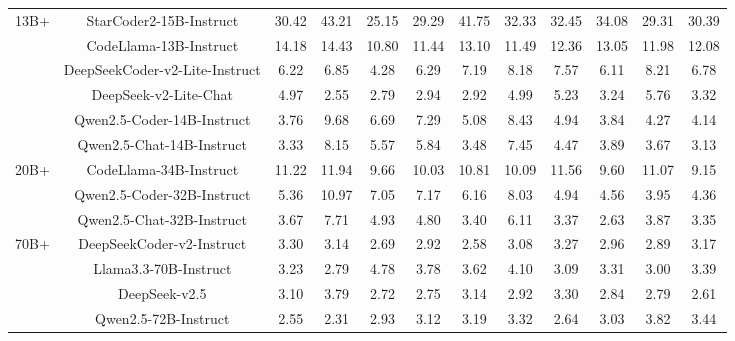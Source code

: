 \documentclass[11pt, a4paper, logo, copyright, nonumbering, amsart]{map}
\begin{document}
\begin{CJK*}{UTF8}{gbsn}
\begin{table*}[h!]
\begin{adjustbox}{width=\textwidth}
\begin{tabular}{c|c|cccccccccc}
    \midrule
    \multirow{6}{*}{13B+} 
    & StarCoder2-15B-Instruct & 30.42 & 43.21 & 25.15 & 29.29 & 41.75 & 32.33 & 32.45 & 34.08 & 29.31 & 30.39 \\
    & CodeLlama-13B-Instruct & 14.18 & 14.43 & 10.80 & 11.44 & 13.10 & 11.49 & 12.36 & 13.05 & 11.98 & 12.08 \\
    & DeepSeekCoder-v2-Lite-Instruct & 6.22 & 6.85 & 4.28 & 6.29 & 7.19 & 8.18 & 7.57 & 6.11 & 8.21 & 6.78 \\
    & DeepSeek-v2-Lite-Chat & 4.97 & 2.55 & 2.79 & 2.94 & 2.92 & 4.99 & 5.23 & 3.24 & 5.76 & 3.32 \\
    & Qwen2.5-Coder-14B-Instruct & 3.76 & 9.68 & 6.69 & 7.29 & 5.08 & 8.43 & 4.94 & 3.84 & 4.27 & 4.14 \\
    & Qwen2.5-Chat-14B-Instruct & 3.33 & 8.15 & 5.57 & 5.84 & 3.48 & 7.45 & 4.47 & 3.89 & 3.67 & 3.13 \\
    
    \midrule
    \multirow{3}{*}{20B+} 
    & CodeLlama-34B-Instruct & 11.22 & 11.94 & 9.66 & 10.03 & 10.81 & 10.09 & 11.56 & 9.60 & 11.07 & 9.15 \\
    & Qwen2.5-Coder-32B-Instruct & 5.36 & 10.97 & 7.05 & 7.17 & 6.16 & 8.03 & 4.94 & 4.56 & 3.95 & 4.36 \\
    & Qwen2.5-Chat-32B-Instruct & 3.67 & 7.71 & 4.93 & 4.80 & 3.40 & 6.11 & 3.37 & 2.63 & 3.87 & 3.35 \\
    
    \midrule
    \multirow{4}{*}{70B+} 
    & DeepSeekCoder-v2-Instruct & 3.30 & 3.14 & 2.69 & 2.92 & 2.58 & 3.08 & 3.27 & 2.96 & 2.89 & 3.17 \\
    & Llama3.3-70B-Instruct & 3.23 & 2.79 & 4.78 & 3.78 & 3.62 & 4.10 & 3.09 & 3.31 & 3.00 & 3.39 \\
    & DeepSeek-v2.5 & 3.10 & 3.79 & 2.72 & 2.75 & 3.14 & 2.92 & 3.30 & 2.84 & 2.79 & 2.61 \\
    & Qwen2.5-72B-Instruct & 2.55 & 2.31 & 2.93 & 3.12 & 3.19 & 3.32 & 2.64 & 3.03 & 3.82 & 3.44 \\
    

\end{tabular}
\end{adjustbox}
\end{table*}
\end{CJK*}
\end{document}
